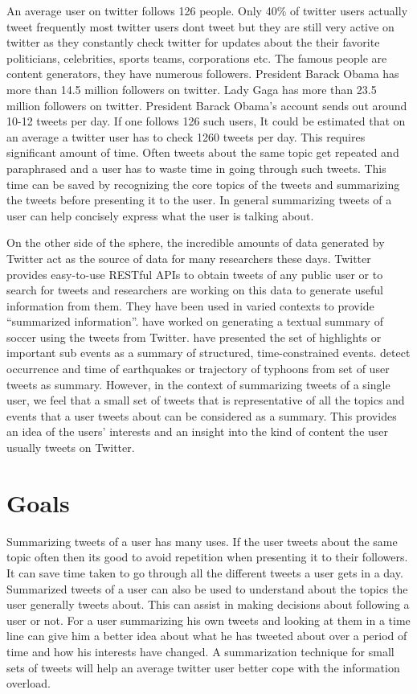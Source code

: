 An average user on twitter follows 126 people. Only 40\% of twitter users actually tweet frequently most twitter users dont tweet but they are still very active on twitter as they constantly check twitter for updates about the their favorite politicians, celebrities, sports teams, corporations etc. The famous people are content generators, they have numerous followers.  President Barack Obama has more than 14.5 million followers on twitter. Lady Gaga has more than 23.5 million followers on twitter. President Barack Obama's account sends out around 10-12 tweets per day. If one follows 126 such users, It could be estimated that on an average a twitter user has to check 1260 tweets per day. This requires significant amount of time. Often tweets about the same topic get repeated and paraphrased and a user has to waste time in going through such tweets. This time can be saved by recognizing the core topics of the tweets and summarizing the tweets before presenting it to the user. In general summarizing tweets of a user can help concisely express what the user is talking about.

On the other side of the sphere, the incredible amounts of data generated by Twitter act as the source of data for many researchers these days. Twitter provides easy-to-use RESTful APIs to obtain tweets of any public user or to search for tweets and researchers are working on this data to generate useful information from them. They have been used in varied contexts to provide “summarized information”. \citet{Nichols:2012:SSE:2166966.2166999} have worked on generating a textual summary of soccer using the tweets from Twitter. \citet{DBLP:conf/icwsm/ChakrabartiP11} have presented the set of highlights or important sub events as a summary of structured, time-constrained events. \citet{Sakaki:2010:EST:1772690.1772777} detect occurrence and time of earthquakes or trajectory of typhoons from set of user tweets as summary. However, in the context of summarizing tweets of a single user, we feel that a small set of tweets that is representative of all the topics and events that a user tweets about can be considered as a summary. This  provides an idea of the users' interests and an insight into the kind of content the user usually tweets on Twitter.

\section{Goals}
Summarizing tweets of a user has many uses. If the user tweets about the same topic often then its good to avoid repetition when presenting it to their followers. It can save time taken to go through all the different tweets a user gets in a day. Summarized tweets of a user can also be used to understand about the topics the user generally tweets about. This can assist in making decisions about following a user or not. For a user summarizing his own tweets and looking at them in a time line can give him a better idea about what he has tweeted about over a period of time and how his interests have changed. A summarization technique for small sets of tweets will help an average twitter user better cope with the information overload. 

